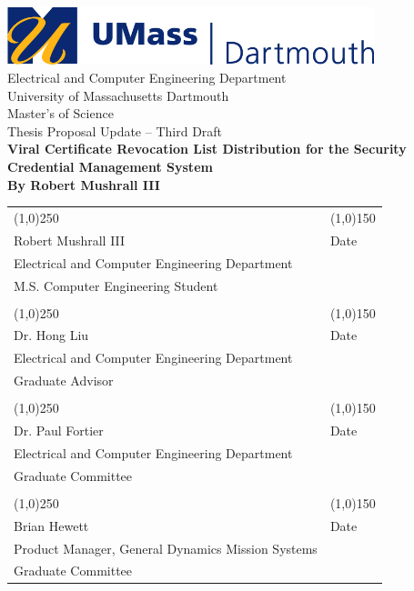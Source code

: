 \documentclass {article}
\begin{document}

\begin{titlepage}
	\centering
	\includegraphics[width=0.8\textwidth]{images/umd_logo.jpg} \\ \bigskip
	\LARGE{Electrical and Computer Engineering Department \\University of Massachusetts Dartmouth}\\
	\bigskip 
	\LARGE{Master's of Science \\ Thesis Proposal Update -- Third Draft} \\
	\bigskip 
	\Huge{\bf Viral Certificate Revocation List Distribution for the Security Credential Management System} \\ \medskip
	\LARGE{\bf By Robert Mushrall III}

	\vfill
	\begin{table}[!hb]
		\centering
		\begin{tabular}{ l l }
			\line(1,0){250} & \line(1,0){150} \\
			\small{Robert Mushrall III}  & \small{Date} \\
			\small{Electrical and Computer Engineering Department} \\
			\small{M.S. Computer Engineering Student} & \\
			\vspace{.3cm} \\
			\line(1,0){250} & \line(1,0){150} \\
			\small{Dr. Hong Liu} & \small{Date} \\
			\small{Electrical and Computer Engineering Department} \\
			\small{Graduate Advisor} & \\
			\vspace{.3cm} \\
			\line(1,0){250} & \line(1,0){150} \\
			\small{Dr. Paul Fortier} & \small{Date} \\
			\small{Electrical and Computer Engineering Department} \\
			\small{Graduate Committee} & \\
			\vspace{.3cm} \\
			\line(1,0){250} & \line(1,0){150} \\
			\small{Brian Hewett} & \small{Date} \\
			\small{Product Manager, General Dynamics Mission Systems} \\
			\small{Graduate Committee} & \\
		\end{tabular}
	\end{table}
	\thispagestyle{empty}
\end{titlepage}
\setcounter{page}{2}
\end{document}
